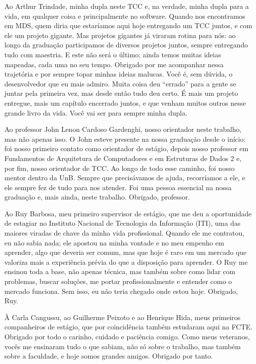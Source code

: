 \begin{agradecimentos}
Ao Arthur Trindade, minha dupla neste TCC e, na verdade, minha dupla para a vida, em qualquer coisa e principalmente no software. Quando nos encontramos em MDS, quem diria que estaríamos aqui hoje entregando um TCC juntos, e com ele um projeto gigante. Mas projetos gigantes já viraram rotina para nós: ao longo da graduação participamos de diversos projetos juntos, sempre entregando tudo com maestria. E este não será o último; ainda temos muitas ideias mapeadas, cada uma no seu tempo. Obrigado por me acompanhar nessa trajetória e por sempre topar minhas ideias malucas. Você é, sem dúvida, o desenvolvedor que eu mais admiro. Muita coisa deu ``errado'' para a gente se juntar pela primeira vez, mas desde então tudo deu certo. É mais um projeto entregue, mais um capítulo encerrado juntos, e que venham muitos outros nesse grande livro da vida. Você vai ser para sempre minha dupla.

Ao professor John Lenon Cardoso Gardenghi, nosso orientador neste trabalho, mas não apenas isso. O John esteve presente na nossa graduação desde o início: foi nosso primeiro contato como orientador de estágio, depois nosso professor em Fundamentos de Arquitetura de Computadores e em Estruturas de Dados 2 e, por fim, nosso orientador de TCC. Ao longo de todo esse caminho, foi nosso mentor dentro da UnB. Sempre que precisávamos de ajuda, recorríamos a ele, e ele sempre fez de tudo para nos atender. Foi uma pessoa essencial na nossa graduação e, mais ainda, neste trabalho. Obrigado, professor.

Ao Ruy Barbosa, meu primeiro supervisor de estágio, que me deu a oportunidade de estagiar no Instituto Nacional de Tecnologia da Informação (ITI), uma das maiores viradas de chave da minha vida profissional. Quando ele me contratou, eu não sabia nada; ele apostou na minha vontade e no meu empenho em aprender, algo que deveria ser comum, mas que hoje é raro em um mercado que valoriza mais a experiência prévia do que a disposição para aprender. O Ruy me ensinou toda a base, não apenas técnica, mas também sobre como lidar com problemas, buscar soluções, me portar profissionalmente e entender como o mercado funciona. Sem isso, eu não teria chegado onde estou hoje. Obrigado, Ruy.

À Carla Cangussu, ao Guilherme Peixoto e ao Henrique Hida, meus primeiros companheiros de estágio, que por coincidência também estudaram aqui na FCTE. Obrigado por todo o carinho, cuidado e paciência comigo. Como meus veteranos, vocês me ensinaram tudo o que sabiam, não só sobre o trabalho, mas também sobre a faculdade, e hoje somos grandes amigos. Obrigado por tanto.


\end{agradecimentos}

